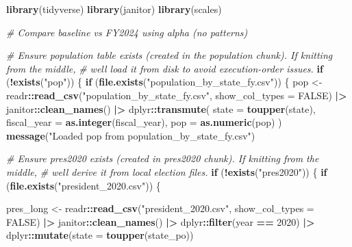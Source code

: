 \documentclass[
  11pt,
]{article}
\newenvironment{Shaded}{\begin{snugshade}}{\end{snugshade}}
\newcommand{\AttributeTok}[1]{\textcolor[rgb]{0.13,0.29,0.53}{#1}}
\newcommand{\CommentTok}[1]{\textcolor[rgb]{0.56,0.35,0.01}{\textit{#1}}}
\newcommand{\ConstantTok}[1]{\textcolor[rgb]{0.56,0.35,0.01}{#1}}
\newcommand{\ControlFlowTok}[1]{\textcolor[rgb]{0.13,0.29,0.53}{\textbf{#1}}}
\newcommand{\DecValTok}[1]{\textcolor[rgb]{0.00,0.00,0.81}{#1}}
\newcommand{\FunctionTok}[1]{\textcolor[rgb]{0.13,0.29,0.53}{\textbf{#1}}}
\newcommand{\NormalTok}[1]{#1}
\newcommand{\OtherTok}[1]{\textcolor[rgb]{0.56,0.35,0.01}{#1}}
\newcommand{\SpecialCharTok}[1]{\textcolor[rgb]{0.81,0.36,0.00}{\textbf{#1}}}
\newcommand{\StringTok}[1]{\textcolor[rgb]{0.31,0.60,0.02}{#1}}
\begin{document}
\begin{Shaded}
\begin{Highlighting}[]
\FunctionTok{library}\NormalTok{(tidyverse)}
\FunctionTok{library}\NormalTok{(janitor)}
\FunctionTok{library}\NormalTok{(scales)}

\CommentTok{\# Compare baseline vs FY2024 using alpha (no patterns)}

\CommentTok{\# Ensure population table exists (created in the population chunk). If knitting from the middle,}
\CommentTok{\# we\textquotesingle{}ll load it from disk to avoid execution{-}order issues.}
\ControlFlowTok{if}\NormalTok{ (}\SpecialCharTok{!}\FunctionTok{exists}\NormalTok{(}\StringTok{"pop"}\NormalTok{)) \{}
  \ControlFlowTok{if}\NormalTok{ (}\FunctionTok{file.exists}\NormalTok{(}\StringTok{"population\_by\_state\_fy.csv"}\NormalTok{)) \{}
\NormalTok{    pop }\OtherTok{\textless{}{-}}\NormalTok{ readr}\SpecialCharTok{::}\FunctionTok{read\_csv}\NormalTok{(}\StringTok{"population\_by\_state\_fy.csv"}\NormalTok{, }\AttributeTok{show\_col\_types =} \ConstantTok{FALSE}\NormalTok{) }\SpecialCharTok{|\textgreater{}}
\NormalTok{      janitor}\SpecialCharTok{::}\FunctionTok{clean\_names}\NormalTok{() }\SpecialCharTok{|\textgreater{}}
\NormalTok{      dplyr}\SpecialCharTok{::}\FunctionTok{transmute}\NormalTok{(}
        \AttributeTok{state =} \FunctionTok{toupper}\NormalTok{(state),}
        \AttributeTok{fiscal\_year =} \FunctionTok{as.integer}\NormalTok{(fiscal\_year),}
        \AttributeTok{pop =} \FunctionTok{as.numeric}\NormalTok{(pop)}
\NormalTok{      )}
    \FunctionTok{message}\NormalTok{(}\StringTok{"Loaded pop from population\_by\_state\_fy.csv"}\NormalTok{)}

\CommentTok{\# Ensure pres2020 exists (created in pres2020 chunk). If knitting from the middle,}
\CommentTok{\# we\textquotesingle{}ll derive it from local election files.}
\ControlFlowTok{if}\NormalTok{ (}\SpecialCharTok{!}\FunctionTok{exists}\NormalTok{(}\StringTok{"pres2020"}\NormalTok{)) \{}
  \ControlFlowTok{if}\NormalTok{ (}\FunctionTok{file.exists}\NormalTok{(}\StringTok{"president\_2020.csv"}\NormalTok{)) \{}

\NormalTok{    pres\_long }\OtherTok{\textless{}{-}}\NormalTok{ readr}\SpecialCharTok{::}\FunctionTok{read\_csv}\NormalTok{(}\StringTok{"president\_2020.csv"}\NormalTok{, }\AttributeTok{show\_col\_types =} \ConstantTok{FALSE}\NormalTok{) }\SpecialCharTok{|\textgreater{}}
\NormalTok{      janitor}\SpecialCharTok{::}\FunctionTok{clean\_names}\NormalTok{() }\SpecialCharTok{|\textgreater{}}
\NormalTok{      dplyr}\SpecialCharTok{::}\FunctionTok{filter}\NormalTok{(year }\SpecialCharTok{==} \DecValTok{2020}\NormalTok{) }\SpecialCharTok{|\textgreater{}}
\NormalTok{      dplyr}\SpecialCharTok{::}\FunctionTok{mutate}\NormalTok{(}\AttributeTok{state =} \FunctionTok{toupper}\NormalTok{(state\_po))}


\end{Highlighting}
\end{Shaded}
\end{document}
